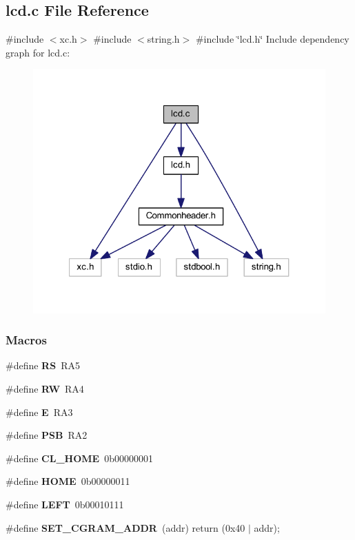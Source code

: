 \subsection{lcd.\+c File Reference}
\label{a00032}
{\ttfamily \#include $<$xc.\+h$>$}\newline
{\ttfamily \#include $<$string.\+h$>$}\newline
{\ttfamily \#include \char`\"{}lcd.\+h\char`\"{}}\newline
Include dependency graph for lcd.\+c\+:
\nopagebreak
\begin{figure}[H]
\begin{center}
\leavevmode
\includegraphics[width=321pt]{a00033}
\end{center}
\end{figure}
\subsubsection*{Macros}
\begin{DoxyCompactItemize}
\item 
\#define \textbf{ RS}~R\+A5
\item 
\#define \textbf{ RW}~R\+A4
\item 
\#define \textbf{ E}~R\+A3
\item 
\#define \textbf{ P\+SB}~R\+A2
\item 
\#define \textbf{ C\+L\+\_\+\+H\+O\+ME}~0b00000001
\item 
\#define \textbf{ H\+O\+ME}~0b00000011
\item 
\#define \textbf{ L\+E\+FT}~0b00010111
\item 
\#define \textbf{ S\+E\+T\+\_\+\+C\+G\+R\+A\+M\+\_\+\+A\+D\+DR}~(addr) return (0x40 $\vert$ addr);
\end{DoxyCompactItemize}
